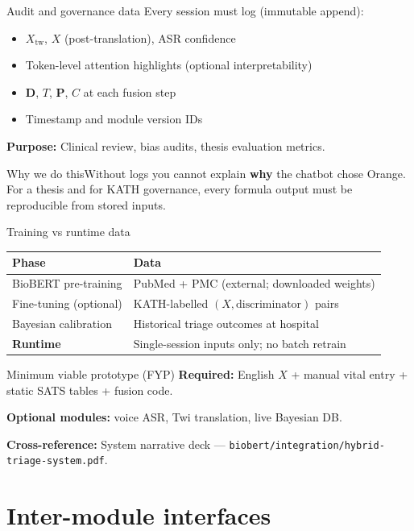 \documentclass[aspectratio=169,11pt]{beamer}
\newcommand{\why}[1]{\begin{block}{Why we do this}\small #1\end{block}}
\begin{document}
\begin{frame}{Audit and governance data}
	Every session must log (immutable append):
	\begin{itemize}
		\item $X_{\text{tw}}$, $X$ (post-translation), ASR confidence
		\item Token-level attention highlights (optional interpretability)
		\item $\mathbf{D}$, $T$, $\mathbf{P}$, $C$ at each fusion step
		\item Timestamp and module version IDs
	\end{itemize}

	\textbf{Purpose:} Clinical review, bias audits, thesis evaluation metrics.

	\why{Without logs you cannot explain \textbf{why} the chatbot chose Orange. For a thesis and for KATH governance, every formula output must be reproducible from stored inputs.}
\end{frame}

\begin{frame}{Training vs runtime data}
	\small
	\begin{tabular}{@{}ll@{}}
		\toprule
		\textbf{Phase} & \textbf{Data} \\
		\midrule
		BioBERT pre-training & PubMed + PMC (external; downloaded weights) \\
		Fine-tuning (optional) & KATH-labelled $(X,\text{discriminator})$ pairs \\
		Bayesian calibration & Historical triage outcomes at hospital \\
		\textbf{Runtime} & Single-session inputs only; no batch retrain \\
		\bottomrule
	\end{tabular}
\end{frame}

\begin{frame}{Minimum viable prototype (FYP)}
	\textbf{Required:} English $X$ + manual vital entry + static SATS tables + fusion code.

	\textbf{Optional modules:} voice ASR, Twi translation, live Bayesian DB.

	\textbf{Cross-reference:} System narrative deck --- \texttt{biobert/integration/hybrid-triage-system.pdf}.
\end{frame}

\section{Inter-module interfaces}
\end{document}
